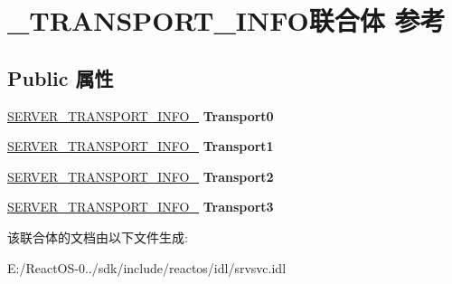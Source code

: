 \hypertarget{union___t_r_a_n_s_p_o_r_t___i_n_f_o}{}\section{\+\_\+\+T\+R\+A\+N\+S\+P\+O\+R\+T\+\_\+\+I\+N\+F\+O联合体 参考}
\label{union___t_r_a_n_s_p_o_r_t___i_n_f_o}
\subsection*{Public 属性}
\begin{DoxyCompactItemize}
\item 
\mbox{\label{union___t_r_a_n_s_p_o_r_t___i_n_f_o_af0833938529a058eeb302aed1fae2373}} 
\hyperlink{struct___s_e_r_v_e_r___t_r_a_n_s_p_o_r_t___i_n_f_o__0}{S\+E\+R\+V\+E\+R\+\_\+\+T\+R\+A\+N\+S\+P\+O\+R\+T\+\_\+\+I\+N\+F\+O\+\_} {\bfseries Transport0}
\item 
\mbox{\label{union___t_r_a_n_s_p_o_r_t___i_n_f_o_aa11598d6a639f1078bc4beaa891b4bca}} 
\hyperlink{struct___s_e_r_v_e_r___t_r_a_n_s_p_o_r_t___i_n_f_o__1}{S\+E\+R\+V\+E\+R\+\_\+\+T\+R\+A\+N\+S\+P\+O\+R\+T\+\_\+\+I\+N\+F\+O\+\_} {\bfseries Transport1}
\item 
\mbox{\label{union___t_r_a_n_s_p_o_r_t___i_n_f_o_ac09412a34dc93fdda3f8e8211054e9c2}} 
\hyperlink{struct___s_e_r_v_e_r___t_r_a_n_s_p_o_r_t___i_n_f_o__2}{S\+E\+R\+V\+E\+R\+\_\+\+T\+R\+A\+N\+S\+P\+O\+R\+T\+\_\+\+I\+N\+F\+O\+\_} {\bfseries Transport2}
\item 
\mbox{\label{union___t_r_a_n_s_p_o_r_t___i_n_f_o_a4f76d4b24097306325103a155c75ea22}} 
\hyperlink{struct___s_e_r_v_e_r___t_r_a_n_s_p_o_r_t___i_n_f_o__3}{S\+E\+R\+V\+E\+R\+\_\+\+T\+R\+A\+N\+S\+P\+O\+R\+T\+\_\+\+I\+N\+F\+O\+\_} {\bfseries Transport3}
\end{DoxyCompactItemize}


该联合体的文档由以下文件生成\+:\begin{DoxyCompactItemize}
\item 
E\+:/\+React\+O\+S-\/0../sdk/include/reactos/idl/srvsvc.\+idl\end{DoxyCompactItemize}
